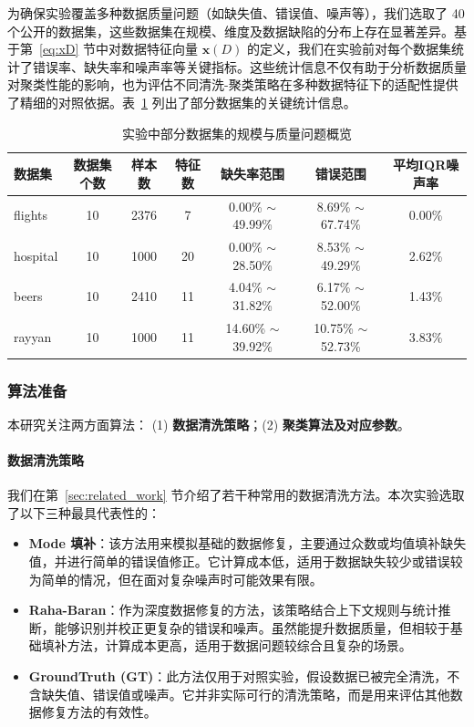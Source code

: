 \documentclass[10pt]{article} %
\numberwithin{equation}{section}
\begin{document}
为确保实验覆盖多种数据质量问题（如缺失值、错误值、噪声等），我们选取了 40 个公开的数据集，这些数据集在规模、维度及数据缺陷的分布上存在显著差异。基于第~\ref{eq:xD} 节中对数据特征向量 $\mathbf{x}(D)$ 的定义，我们在实验前对每个数据集统计了错误率、缺失率和噪声率等关键指标。这些统计信息不仅有助于分析数据质量对聚类性能的影响，也为评估不同清洗-聚类策略在多种数据特征下的适配性提供了精细的对照依据。表~\ref{tab:datasets_info} 列出了部分数据集的关键统计信息。

\begin{table}[htbp]
    \centering
    \begin{tabular}{lcccccc}
    \toprule
    \textbf{数据集} & \textbf{数据集个数} & \textbf{样本数} & \textbf{特征数} & \textbf{缺失率范围} & \textbf{错误范围} & \textbf{平均IQR噪声率} \\
    \midrule
    flights  & 10  & 2376   & 7  & 0.00\% $\sim$ 49.99\% & 8.69\% $\sim$ 67.74\%  & 0.00\%  \\
    hospital & 10  & 1000   & 20 & 0.00\% $\sim$ 28.50\% & 8.53\% $\sim$ 49.29\%  & 2.62\%  \\
    beers    & 10  & 2410   & 11 & 4.04\% $\sim$ 31.82\% & 6.17\% $\sim$ 52.00\%  & 1.43\%  \\
    rayyan   & 10  & 1000   & 11 & 14.60\% $\sim$ 39.92\% & 10.75\% $\sim$ 52.73\% & 3.83\%  \\
    \bottomrule
    \end{tabular}
    \caption{实验中部分数据集的规模与质量问题概览}
    \label{tab:datasets_info}
\end{table}

\noindent
\vspace{-20pt} %

\subsubsection{算法准备}
\label{sec:algo_prep}

本研究关注两方面算法：
(1) \textbf{数据清洗策略}；(2) \textbf{聚类算法及对应参数}。

\paragraph{数据清洗策略}
我们在第~\ref{sec:related_work} 节介绍了若干种常用的数据清洗方法。本次实验选取了以下三种最具代表性的：
\begin{itemize}
	\item \textbf{Mode 填补}：该方法用来模拟基础的数据修复，主要通过众数或均值填补缺失值，并进行简单的错误值修正。它计算成本低，适用于数据缺失较少或错误较为简单的情况，但在面对复杂噪声时可能效果有限。
	\item \textbf{Raha-Baran}：作为深度数据修复的方法，该策略结合上下文规则与统计推断，能够识别并校正更复杂的错误和噪声。虽然能提升数据质量，但相较于基础填补方法，计算成本更高，适用于数据问题较综合且复杂的场景。
	\item \textbf{GroundTruth (GT)}：此方法仅用于对照实验，假设数据已被完全清洗，不含缺失值、错误值或噪声。它并非实际可行的清洗策略，而是用来评估其他数据修复方法的有效性。

\end{itemize}
\end{document}
